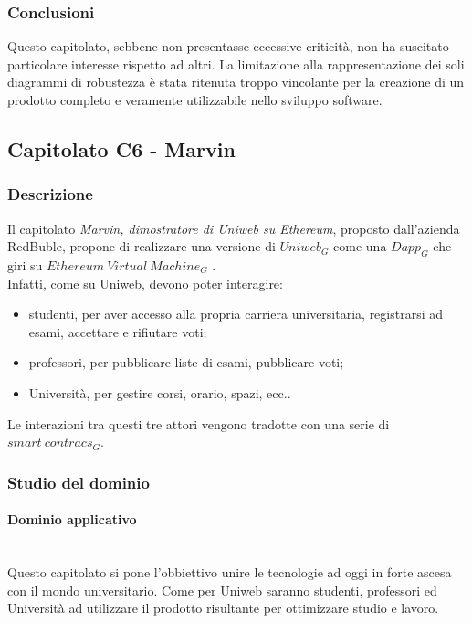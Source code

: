 		\subsubsection{Conclusioni}
		Questo capitolato, sebbene non presentasse eccessive criticità, non ha suscitato particolare interesse rispetto ad altri. La limitazione alla rappresentazione dei soli diagrammi di robustezza è stata ritenuta troppo vincolante per la creazione di un prodotto completo e veramente utilizzabile nello sviluppo software.
		
		
	\subsection{Capitolato C6 - Marvin}
		\subsubsection{Descrizione}
		Il capitolato \emph{Marvin, dimostratore di Uniweb su Ethereum}, proposto dall'azienda RedBuble, propone di realizzare una versione di $Uniweb_G$ come una $Dapp_G$ che giri su $Ethereum\: Virtual\: Machine_G$ . \\  Infatti, come su Uniweb, devono poter interagire:
		\begin{itemize} 
			\item studenti, per aver accesso alla propria carriera universitaria, registrarsi ad esami, accettare e rifiutare voti; 
			\item professori, per pubblicare liste di esami, pubblicare voti;
			\item Università, per gestire corsi, orario, spazi, ecc..
		\end{itemize}
	 	Le interazioni tra questi tre attori vengono tradotte con una serie di $smart\: contracs_G$.
		\subsubsection{Studio del dominio}
			\paragraph{Dominio applicativo}
			\mbox{}\\
			Questo capitolato si pone l'obbiettivo unire le tecnologie ad oggi in forte ascesa con il mondo universitario. Come per Uniweb saranno studenti, professori ed Università ad utilizzare il prodotto risultante per ottimizzare studio e lavoro.
